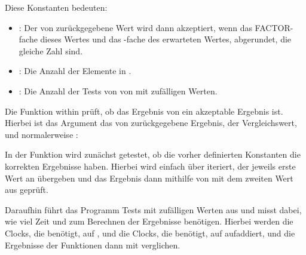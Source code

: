 \documentclass{article}
\begin{document}
\vspace{0.5cm}

	Diese Konstanten bedeuten:

	\begin{itemize}
	\item {}: Der von  zurückgegebene Wert wird
	dann akzeptiert, wenn das FACTOR-fache dieses Wertes und das
	-fache des erwarteten Wertes, abgerundet, die gleiche
	Zahl sind.
	\item {}: Die Anzahl der Elemente in .
	\item {}: Die Anzahl der Tests von von 
	mit zufälligen Werten.
	\end{itemize}

	Die Funktion within prüft, ob das Ergebnis von 
	ein akzeptable Ergebnis ist. Hierbei ist das Argument 
	das von  zurückgegebene Ergebnis, 
	der Vergleichswert, und  normalerweise :

\vspace{0.5cm}



\vspace{0.5cm}

	In der Funktion  wird zunächst getestet,
	ob die vorher definierten Konstanten die korrekten Ergebnisse
	haben. Hierbei wird einfach über  iteriert,
	der jeweils erste Wert an  übergeben und das
	Ergebnis dann mithilfe von  mit dem zweiten
	Wert aus  geprüft.

\vspace{0.5cm}



\vspace{0.5cm}

	Daraufhin führt das Programm  Tests mit zufälligen
	Werten aus und misst dabei, wie viel Zeit  und 
	zum Berechnen der Ergebnisse benötigen. Hierbei werden die Clocks, die
	 benötigt, auf , und die Clocks,
	die  benötigt, auf  aufaddiert, und die
	Ergebnisse der Funktionen dann mit  verglichen.
\end{document}
